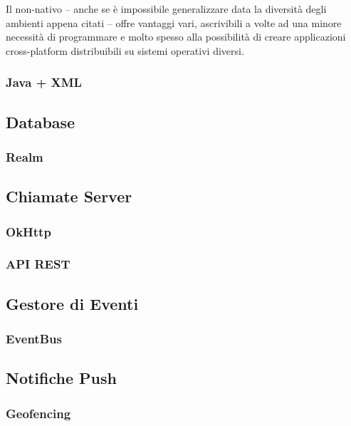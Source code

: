 \documentclass{article}
\begin{document}
Il non-nativo – anche se è impossibile generalizzare data la diversità degli ambienti appena citati – offre vantaggi vari, ascrivibili a volte ad una minore necessità di programmare e molto spesso alla possibilità di creare applicazioni cross-platform distribuibili su sistemi operativi diversi.

\subsubsection{Java + XML}

\subsection{Database}

\subsubsection{Realm}

\subsection{Chiamate Server}

\subsubsection{OkHttp}

\subsubsection{API REST}

\subsection{Gestore di Eventi}

\subsubsection{EventBus}

\subsection{Notifiche Push}

\subsubsection{Geofencing}
\end{document}
